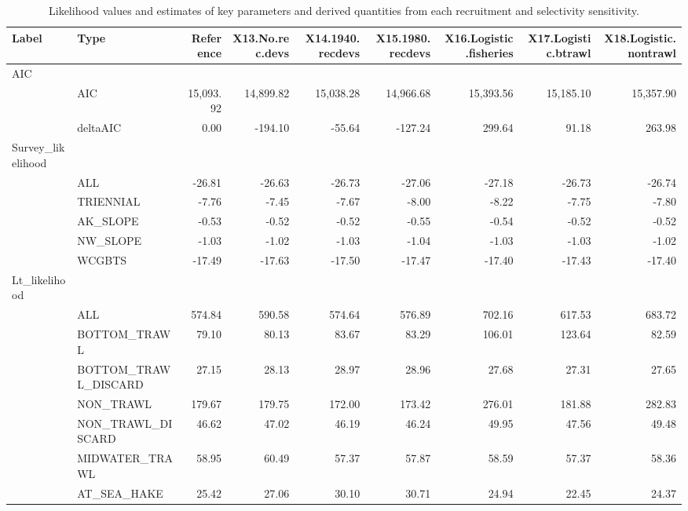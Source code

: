 \documentclass[
]{scrartcl}
\begin{document}
\begin{landscape}
\begingroup
\fontsize{9.0pt}{10.8pt}\selectfont

\begin{longtable}{llrrrrrrr}

\caption{\label{tbl-sensitivities-sel-rec}Likelihood values and
estimates of key parameters and derived quantities from each recruitment
and selectivity sensitivity.}

\tabularnewline

\toprule
Label & Type & Reference & X13.No.rec.devs & X14.1940.recdevs & X15.1980.recdevs & X16.Logistic.fisheries & X17.Logistic.btrawl & X18.Logistic.nontrawl \\ 
\midrule\addlinespace[2.5pt]
AIC &  &  &  &  &  &  &  &  \\ 
 & AIC & 15,093.92 & 14,899.82 & 15,038.28 & 14,966.68 & 15,393.56 & 15,185.10 & 15,357.90 \\ 
 & deltaAIC & 0.00 & -194.10 & -55.64 & -127.24 & 299.64 & 91.18 & 263.98 \\ 
Survey\_likelihood &  &  &  &  &  &  &  &  \\ 
 & ALL & -26.81 & -26.63 & -26.73 & -27.06 & -27.18 & -26.73 & -26.74 \\ 
 & TRIENNIAL & -7.76 & -7.45 & -7.67 & -8.00 & -8.22 & -7.75 & -7.80 \\ 
 & AK\_SLOPE & -0.53 & -0.52 & -0.52 & -0.55 & -0.54 & -0.52 & -0.52 \\ 
 & NW\_SLOPE & -1.03 & -1.02 & -1.03 & -1.04 & -1.03 & -1.03 & -1.02 \\ 
 & WCGBTS & -17.49 & -17.63 & -17.50 & -17.47 & -17.40 & -17.43 & -17.40 \\ 
Lt\_likelihood &  &  &  &  &  &  &  &  \\ 
 & ALL & 574.84 & 590.58 & 574.64 & 576.89 & 702.16 & 617.53 & 683.72 \\ 
 & BOTTOM\_TRAWL & 79.10 & 80.13 & 83.67 & 83.29 & 106.01 & 123.64 & 82.59 \\ 
 & BOTTOM\_TRAWL\_DISCARD & 27.15 & 28.13 & 28.97 & 28.96 & 27.68 & 27.31 & 27.65 \\ 
 & NON\_TRAWL & 179.67 & 179.75 & 172.00 & 173.42 & 276.01 & 181.88 & 282.83 \\ 
 & NON\_TRAWL\_DISCARD & 46.62 & 47.02 & 46.19 & 46.24 & 49.95 & 47.56 & 49.48 \\ 
 & MIDWATER\_TRAWL & 58.95 & 60.49 & 57.37 & 57.87 & 58.59 & 57.37 & 58.36 \\ 
 & AT\_SEA\_HAKE & 25.42 & 27.06 & 30.10 & 30.71 & 24.94 & 22.45 & 24.37 \\ 

\end{longtable}
\end{landscape}
\end{document}
